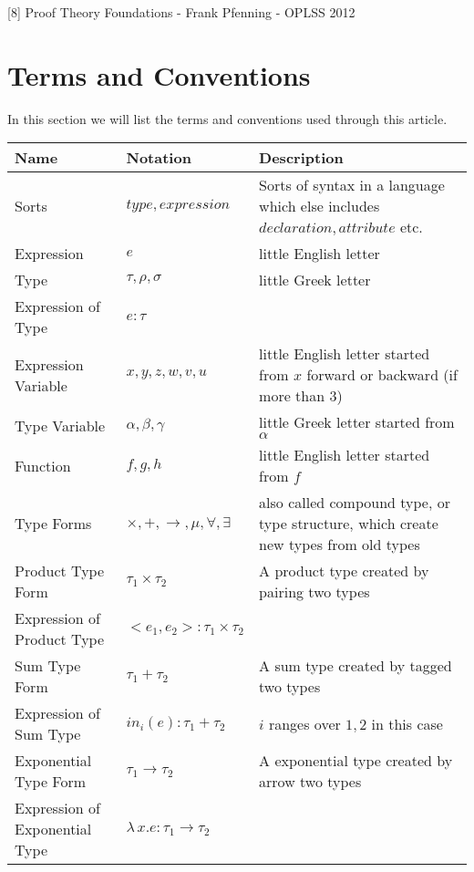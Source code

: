 \documentclass{article}
\begin{document}
[8] Proof Theory Foundations - Frank Pfenning - OPLSS 2012

\section{Terms and Conventions}
In this section we will list the terms and conventions used through this article.

\begin{table}[htp]
\begin{tabularx}
{\linewidth}
{|>{\RaggedRight}p{2.5cm}|x|x|}\hline
Name & Notation & Description\\ \hline
Sorts & $type, expression$ & Sorts of syntax in a language which else includes $declaration, attribute$ etc. \\ \hline
Expression      & $e$ & little English letter \\ \hline
Type	   & $\tau,\rho,\sigma$ & little Greek letter  \\ \hline
Expression of Type & $e:\tau$ & \\ \hline
Expression Variable & $x, y, z, w, v, u$ & little English letter started from $x$ forward or backward (if more than 3) \\ \hline
Type Variable &  $\alpha, \beta, \gamma$ & little Greek letter started from $\alpha$ \\ \hline 
Function &  $f, g, h$ & little English letter started from $f$ \\ \hline 
Type Forms & $\times, +, \rightarrow, \mu, \forall, \exists$ & also called compound type, or type structure, which create new types from old types \\ \hline
Product Type Form & $\tau_{1}\times\tau_{2}$ & A product type created by pairing two types \\ \hline
Expression of Product Type & $<e_{1}, e_{2}> : \tau_{1}\times\tau_{2}$ & \\ \hline
Sum Type Form & $\tau_{1}+\tau_{2}$ & A sum type created by tagged two types \\ \hline
Expression of Sum Type & $in_{i}(e) : \tau_{1}+\tau_{2}$ & $i$ ranges over $1,2$ in this case \\ \hline
Exponential Type Form & $\tau_{1}\rightarrow\tau_{2}$ & A exponential type created by arrow two types \\ \hline
Expression of Exponential Type & $\lambda\,x.e : \tau_{1}\rightarrow\tau_{2}$ & \\ \hline
\end{tabularx}
\end{table}
\end{document}

